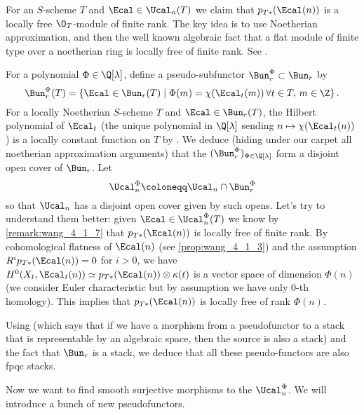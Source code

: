         \begin{remark}
            \label{remark:wang_4_1_7}
            For an $S$-scheme $T$ and $\Ecal \in \Ucal_n(T)$ we claim that $p_{T*}(\Ecal(n))$ is a locally free $\O_T$-module of finite rank. The key idea is to use Noetherian approximation, and then the well known algebraic fact that a flat module of finite type over a noetherian ring is locally free of finite rank. See \cite[Remark~4.1.7]{wang:moduli}.
        \end{remark}

        For a polynomial $\Phi \in \Q[\lambda]$, define a pseudo-subfunctor $\Bun_r^{\Phi} \subset \Bun_r$ by \[\Bun_r^{\Phi}(T) = \left\{\Ecal \in \Bun_r(T) \mid \Phi(m) = \chi(\Ecal_t(m)) \, \forall t \in T,\, m \in \Z \right\}. \] For a locally Noetherian $S$-scheme $T$ and $\Ecal \in \Bun_r(T)$, the Hilbert polynomial of $\Ecal_t$ (the unique polynomial in $\Q[\lambda]$ sending $n \mapsto \chi(\Ecal_t(n))$) is a locally constant function on $T$ by \cite[Tome~2, Theorem~7.9.4]{EGA3}. We deduce (hiding under our carpet all noetherian approximation arguments) that the $(\Bun_r^{\Phi})_{\Phi \in \Q[\lambda]}$ form a disjoint open cover of $\Bun_r$. Let \[\Ucal_n^{\Phi} \coloneqq \Ucal_n \cap \Bun_r^{\Phi} \] so that $\Ucal_n$ has a disjoint open cover given by such opens. 
        Let's try to understand them better: given $\Ecal \in \Ucal_n^{\Phi}(T)$ we know by \cref{remark:wang_4_1_7} that $p_{T*}(\Ecal(n))$ is locally free of finite rank. By cohomological flatness of $\Ecal(n)$ (see \cref{prop:wang_4_1_3}) and the assumption $R^ip_{T*}(\Ecal(n)) = 0$ for $i> 0$, we have $H^0(X_t, \Ecal_t(n)) \simeq p_{T*}(\Ecal(n)) \otimes \kappa(t)$ is a vector space of dimension $\Phi(n)$ (we consider Euler characteristic but by assumption we have only $0$-th homology). This implies that $p_{T*}(\Ecal(n))$ is locally free of rank $\Phi(n)$.

        Using \cite[\href{https://stacks.math.columbia.edu/tag/05UN}{Lemma~05UN}]{stacks-project} (which says that if we have  a morphism from a pseudofunctor to a stack that is representable by an algebraic space, then the source is also a stack) and the fact that $\Bun_r$ is a stack, we deduce that all these pseudo-functors are also fpqc stacks.

        Now we want to find smooth surjective morphisms to the $\Ucal_n^{\Phi}$. We will introduce a bunch of new pseudofunctors.

